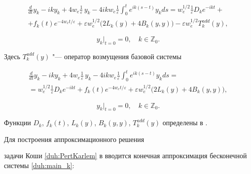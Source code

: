 \begin{multline}

\frac{d}{dt}y_k-iky_k+4w_e\frac1\varepsilon\,y_k-4ikw_e\frac1\varepsilon \int_0^t e^{ik(s-t)}y_kds

=w_e^{1/2}\frac1\varepsilon D_ke^{-ikt}+ \\

+ f_k(t) e^{-4w_e t/\varepsilon }

+\varepsilon w_e^{1/2}\bigl( 2L_k(y)+4B_k(y,y)\bigr)-\varepsilon w_e^{1/2} T^{add}_k(y),

\label{duh:main_k}

\end{multline}

$$

y_k\big|_{t=0}=0,\quad k\in \mathbb Z_0.

$$

Здесь $T_k^{add}(y)$ "--- оператор возмущения  базовой системы

\begin{multline}

\frac{d}{dt}y_k-iky_k+4w_e\frac1\varepsilon\,y_k-4ikw_e\frac1\varepsilon \int_0^t e^{ik(s-t)}y_kds=

\\

=w_e^{1/2}\frac1\varepsilon D_ke^{-ikt}+f_k(t) e^{-4w_e t/ \varepsilon}+\varepsilon w_e^{1/2}\bigl( 2L_k(y)+4B_k(y,y)\bigr),

\label{duh:main_k}

\end{multline}

$$

y_k|_{t=0}=0,\quad k\in \mathbb Z_0.

$$



\newpage



\noindent

Функции $D_k$, $f_k(t)$, $L_k(y)$, $B_k(y,y)$, $T^{add}_k(y)$ определены в \cite{duh:VasDukRad16, duh:RVD1}.



\smallskip



 Для построения аппроксимационного решения

задачи Коши \eqref{duh:PertKarlem} в \cite{duh:RVD1} вводится конечная аппроксимация бесконечной системы \eqref{duh:main_k}:

